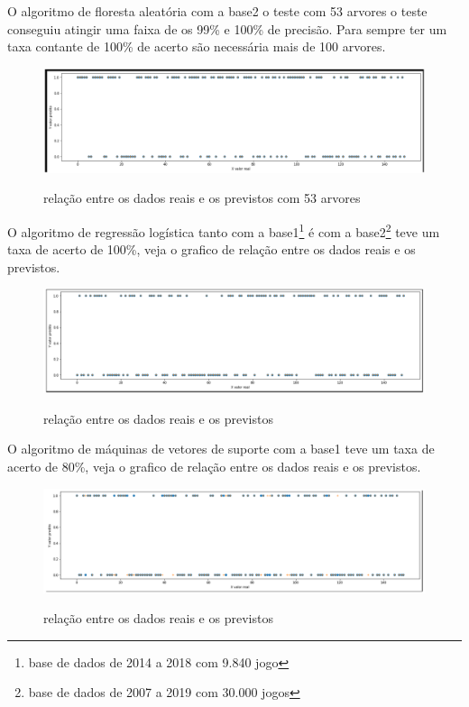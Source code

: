 O algoritmo de floresta aleatória com a base2 o teste com 53 arvores o teste conseguiu atingir uma faixa de os 99\% e 100\% de precisão. Para sempre ter um taxa contante de 100\% de acerto são necessária mais de 100 arvores.
\begin{figure}[htbp]
	\begin{center}
		\includegraphics[width=0.7\linewidth]{imagens/florestaaleatoriaAPI.png}\\
	\end{center}
	\caption[relação entre os dados reais e os previstos com 53 arvores]{relação entre os dados reais e os previstos com 53 arvores}
	\label{fig:logo}
\end{figure}
\newpage
O algoritmo de regressão logística tanto com a base1\footnote[4]{base de dados de 2014 a 2018 com 9.840 jogo} é com a  base2\footnote[5]{base de dados de 2007 a 2019 com 30.000 jogos} teve um taxa de acerto de 100\%, veja o grafico de relação entre os dados reais e os previstos.
\begin{figure}[htbp]
	\begin{center}
		\includegraphics[width=0.7\linewidth]{imagens/regressaologistocaAPI.png}\\
	\end{center}
	\caption[relação entre os dados reais e os previstos]{relação entre os dados reais e os previstos}
	\label{fig:logo}
\end{figure}

O algoritmo de máquinas de vetores de suporte com a base1 teve um taxa de acerto de 80\%, veja o grafico de relação entre os dados reais e os previstos.
\begin{figure}[htbp]
	\begin{center}
		\includegraphics[width=0.7\linewidth]{imagens/SVM.png}\\
	\end{center}
	\caption[relação entre os dados reais e os previstos]{relação entre os dados reais e os previstos}
	\label{fig:logo}
\end{figure}

